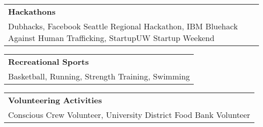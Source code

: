 \documentclass[10pt]{article}
\newcommand{\tabularxwidth}{\textwidth}
\begin{document}
        
            \vspace{.5em}
        

    
        \begin{tabularx}{\tabularxwidth}{X}
            \textbf{Hackathons} \\
            
    
            Dubhacks, 
            Facebook Seattle Regional Hackathon, 
            IBM Bluehack Against Human Trafficking, 
            StartupUW Startup Weekend \\
        \end{tabularx}

        
            \vspace{.5em}
        

    
        \begin{tabularx}{\tabularxwidth}{X}
            \textbf{Recreational Sports} \\
            
    
            Basketball, 
            Running, 
            Strength Training, 
            Swimming \\
        \end{tabularx}

        
            \vspace{.5em}
        

    
        \begin{tabularx}{\tabularxwidth}{X}
            \textbf{Volunteering Activities} \\
            
    
            Conscious Crew Volunteer, 
            University District Food Bank Volunteer \\
        \end{tabularx}

        
\end{document}
